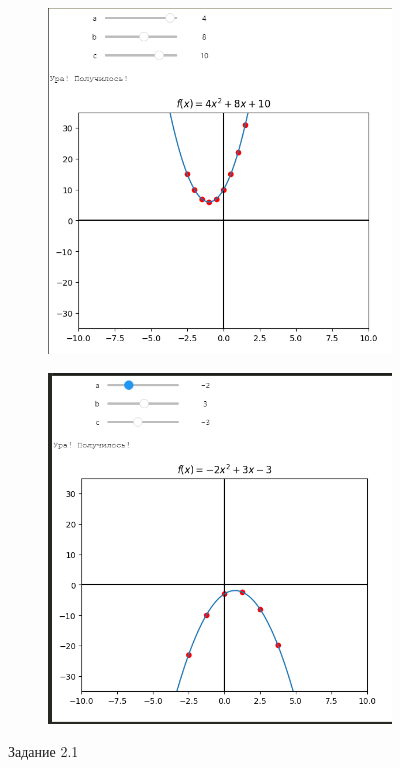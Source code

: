 \documentclass[14pt,a4paper]{extarticle}
\begin{document}
\begin{figure}[h!]
    \begin{subfigure}{.5\textwidth}
        \centering
        \includegraphics[width=0.9\linewidth]{figures/2.1-first.png}
    \end{subfigure}%
    \begin{subfigure}{.5\textwidth}
        \centering
        \includegraphics[width=0.9\linewidth]{figures/2.1-second.png}
    \end{subfigure}

    \caption{Задание 2.1}
    \label{fig:2.1}
\end{figure}
\end{document}
